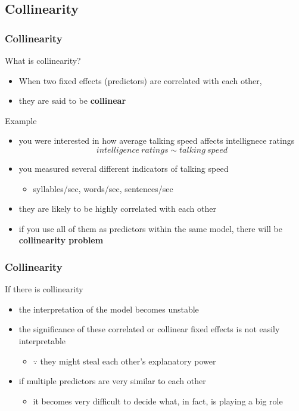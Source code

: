 \documentclass[10p]{beamer}\usepackage[]{graphicx}\usepackage[]{color}
\begin{document}
\subsection{Collinearity}
\begin{frame}
\frametitle{Collinearity}
What is collinearity?
\begin{itemize}
\item When two fixed effects (predictors) are \alert{correlated with} each other,
\item they are said to be \textbf{collinear}
\end{itemize}

Example
\begin{itemize}
\item you were interested in how average talking speed affects intellignece ratings
\begin{displaymath}
intelligence\ ratings \sim talking\ speed
\end{displaymath}
\item you measured several different indicators of talking speed
	\begin{itemize}
	\item syllables/sec, words/sec, sentences/sec
	\end{itemize}
\item they are likely to be highly correlated with each other
\item if you use all of them as predictors within the same model, there will be \textbf{collinearity problem}
\end{itemize}
\end{frame}

\begin{frame}
\frametitle{Collinearity}
If there is collinearity
\begin{itemize}
\item the interpretation of the model becomes \alert{unstable}
\item the significance of these correlated or collinear fixed effects is not easily interpretable
\begin{itemize}
\item $\because$ they might steal each other's \alert{explanatory power}
\end{itemize}
\item if multiple predictors are very similar to each other
	\begin{itemize}
	\item it becomes very difficult to decide what, in fact, is playing a big role
	\end{itemize}
\end{itemize}
\end{frame}
\end{document}
